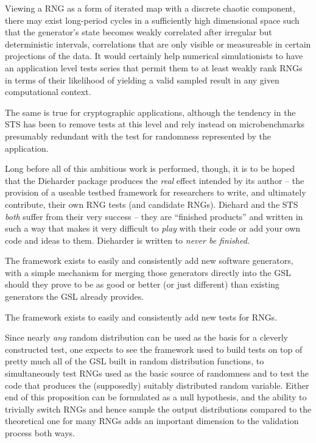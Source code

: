 \documentclass[12pt]{article}
\begin{document}
Viewing a RNG as a form of iterated map with a discrete chaotic
component, there may exist long-period cycles in a sufficiently high
dimensional space such that the generator's state becomes weakly
correlated after irregular but deterministic intervals, correlations
that are only visible or measureable in certain projections of the data.
It would certainly help numerical simulationists to have an application
level tests series that permit them to at least weakly rank RNGs in
terms of their likelihood of yielding a valid sampled result in any
given computational context.

The same is true for cryptographic applications, although the tendency
in the STS has been to remove tests at this level and rely instead on
microbenchmarks presumably redundant with the test for randomness
represented by the application.

Long before all of this ambitious work is performed, though, it is to be
hoped that the Dieharder package produces the {\em real} effect intended
by its author -- the provision of a useable testbed framework for
researchers to write, and ultimately contribute, their own RNG tests
(and candidate RNGs).  Diehard and the STS {\em both} suffer from their
very success -- they are ``finished products'' and written in such a way
that makes it very difficult to {\em play} with their code or add your
own code and ideas to them.  Dieharder is written to {\em never be
finished}.  

The framework exists to easily and consistently add new software
generators, with a simple mechanism for merging those generators
directly into the GSL should they prove to be as good or better (or just
different) than existing generators the GSL already provides.

The framework exists to easily and consistently add new tests for RNGs.

Since nearly {\em any} random distribution can be used as the basis for
a cleverly constructed test, one expects to see the framework used to
build tests on top of pretty much all of the GSL built in random
distribution functions, to simultaneously test RNGs used as the basic
source of randomness and to test the code that produces the (supposedly)
suitably distributed random variable.  Either end of this proposition
can be formulated as a null hypothesis, and the ability to trivially
switch RNGs and hence sample the output distributions compared to the
theoretical one for many RNGs adds an important dimension to the
validation process both ways.
\end{document}
